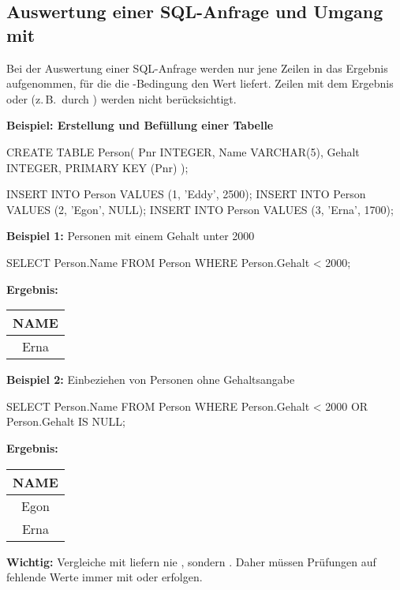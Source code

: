\subsection{Auswertung einer SQL-Anfrage und Umgang mit }
\begin{tcolorbox}[gray={Auswertung von Bedingungen in SQL}]
    Bei der Auswertung einer SQL-Anfrage werden nur jene Zeilen in das Ergebnis aufgenommen,
    für die die -Bedingung den Wert  liefert.  
    Zeilen mit dem Ergebnis  oder  (z.\,B.\ durch ) 
    werden nicht berücksichtigt.

    \textbf{Beispiel: Erstellung und Befüllung einer Tabelle}
    \begin{sql}
    CREATE TABLE Person(
        Pnr INTEGER,
        Name VARCHAR(5),
        Gehalt INTEGER,
        PRIMARY KEY (Pnr)
    );

    INSERT INTO Person VALUES (1, 'Eddy', 2500);
    INSERT INTO Person VALUES (2, 'Egon', NULL);
    INSERT INTO Person VALUES (3, 'Erna', 1700);
    \end{sql}

    \textbf{Beispiel 1:} Personen mit einem Gehalt unter 2000
    \begin{sql}
    SELECT Person.Name
        FROM Person
        WHERE Person.Gehalt < 2000;
    \end{sql}

    \textbf{Ergebnis:}
    \begin{center}
        \begin{tabular}{|c|}
            \hline
            \textbf{NAME} \\
            \hline
            Erna \\
            \hline
        \end{tabular}
    \end{center}

    \textbf{Beispiel 2:} Einbeziehen von Personen ohne Gehaltsangabe
    \begin{sql}
    SELECT Person.Name
        FROM Person
        WHERE Person.Gehalt < 2000 OR Person.Gehalt IS NULL;
    \end{sql}

    \textbf{Ergebnis:}
    \begin{center}
        \begin{tabular}{|c|}
            \hline
            \textbf{NAME} \\
            \hline
            Egon \\
            Erna \\
            \hline
        \end{tabular}
    \end{center}

    \textbf{Wichtig:}  
    Vergleiche mit  liefern nie , sondern .  
    Daher müssen Prüfungen auf fehlende Werte immer mit  oder  erfolgen.
\end{tcolorbox}

